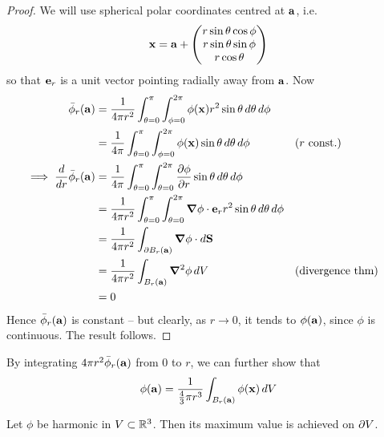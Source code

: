 \documentclass{../template/note}
\begin{document}
    \begin{proof}
        We will use spherical polar coordinates centred at \(\V a\), i.e.
        \begin{align*}
            \V x = \V a + \begin{pmatrix}
             r\sin\theta\cos\phi \\
             r\sin\theta\sin\phi \\
             r\cos\theta \\
            \end{pmatrix}
        \end{align*}
        so that \(\V e_r\) is a unit vector pointing radially away from \(\V a\). Now
        \begin{align*}
            \bar\phi_r(\V a) &= \frac 1 {4\pi r^2} \int_{\theta=0}^\pi \int_{\phi=0}^{2\pi} \phi(\V x) r^2 \sin \theta \D \theta \D \phi \\
            &= \frac 1 {4\pi} \int_{\theta=0}^\pi \int_{\phi=0}^{2\pi} \phi(\V x) \sin \theta \D \theta \D \phi && (r \text{ const.}) \\
            \implies \frac{d}{dr} \bar\phi_r(\V a) &= \frac 1 {4\pi} \int_{\theta=0}^\pi \int_{\theta=0}^{2\pi} \pd{\phi}{r} \sin \theta \D\theta\D\phi \\
            &= \frac 1 {4\pi r^2} \int_{\theta=0}^\pi \int_{\theta=0}^{2\pi} \grad \phi \cdot \V e_r r^2 \sin \theta \D\theta\D\phi \\
            &= \frac 1 {4\pi r^2} \int_{\pr B_r(\V a)} \grad \phi \cdot d\V S \\
            &= \frac 1 {4\pi r^2} \int_{B_r(\V a)} \grad^2 \phi \D V && \text{(divergence thm)} \\
            &= 0
        \end{align*}
        Hence \(\bar\phi_r(\V a)\) is constant -- but clearly, as \(r \to 0\), it tends to \(\phi(\V a)\), since \(\phi\) is continuous. The result follows.
    \end{proof}
    
    \begin{remark*}
        By integrating \(4 \pi r^2 \bar\phi_r(\V a)\) from 0 to \(r\), we can further show that
        \begin{align*}
            \phi(\V a) = \frac 1 {\frac 4 3 \pi r^3} \int_{B_r(\V a)} \phi(\V x) \D V
        \end{align*}
    \end{remark*}

    \begin{proposition*}
        Let \(\phi\) be harmonic in \(V \subset \mathbb R^3\). Then its maximum value is achieved on \(\partial V\).
    \end{proposition*}
    
\end{document}
